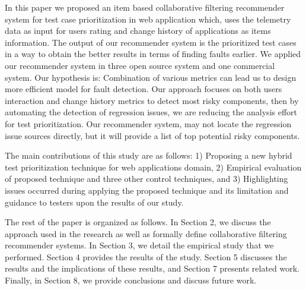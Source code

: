 In this paper we proposed an item based collaborative filtering recommender system 
for test case prioritization in web application which, uses the telemetry 
data as input for users rating and change history of applications 
as items information. The output of our recommender system is the prioritized test 
cases in a way to obtain the better results in terms of finding faults earlier. 
We applied our recommender system in three open source system and one commercial system.
Our hypothesis is: Combination of various metrics can lead us to design 
more efficient model for fault detection. Our approach focuses on both users 
interaction and change history metrics to detect most risky components, then by 
automating the detection of regression issues, we are reducing the analysis effort for 
test prioritization. Our recommender system, may not locate the regression issue sources 
directly, but it will provide a  list of top potential risky components. 

The main contributions of this study are as follows:
1) Proposing a new hybrid test prioritization technique for web applications domain, 
2) Empirical evaluation of proposed technique and three other control techniques, and
3) Highlighting issues occurred during applying the proposed technique and its limitation 
and guidance to testers upon the results of our study. 

The rest of the paper is organized as follows. In Section 2, we
discuss the approach used in the research as well as formally define
collaborative filtering recommender systems. In Section 3, we detail the empirical study
that we performed. Section 4 provides the results of the study. 
Section 5 discusses the results and the implications of these results, and
Section 7 presents related work. Finally, in Section 8, we provide
conclusions and discuss future work.





